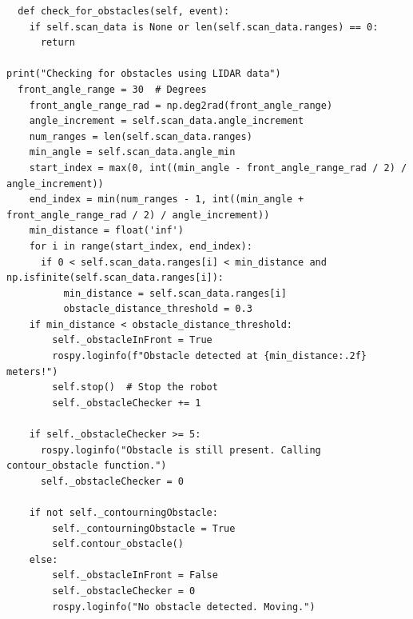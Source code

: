 \documentclass[a4paper,12pt]{extreport}
\begin{document}
  \begin{verbatim}
  def check_for_obstacles(self, event):
    if self.scan_data is None or len(self.scan_data.ranges) == 0:
      return  

print("Checking for obstacles using LIDAR data")
  front_angle_range = 30  # Degrees
    front_angle_range_rad = np.deg2rad(front_angle_range)
    angle_increment = self.scan_data.angle_increment
    num_ranges = len(self.scan_data.ranges)
    min_angle = self.scan_data.angle_min
    start_index = max(0, int((min_angle - front_angle_range_rad / 2) / angle_increment))
    end_index = min(num_ranges - 1, int((min_angle + front_angle_range_rad / 2) / angle_increment))
    min_distance = float('inf')
    for i in range(start_index, end_index):
      if 0 < self.scan_data.ranges[i] < min_distance and np.isfinite(self.scan_data.ranges[i]):
          min_distance = self.scan_data.ranges[i]
          obstacle_distance_threshold = 0.3  
    if min_distance < obstacle_distance_threshold:
        self._obstacleInFront = True
        rospy.loginfo(f"Obstacle detected at {min_distance:.2f} meters!")
        self.stop()  # Stop the robot
        self._obstacleChecker += 1

    if self._obstacleChecker >= 5:
      rospy.loginfo("Obstacle is still present. Calling contour_obstacle function.")
      self._obstacleChecker = 0

    if not self._contourningObstacle:
        self._contourningObstacle = True
        self.contour_obstacle()
    else:
        self._obstacleInFront = False
        self._obstacleChecker = 0  
        rospy.loginfo("No obstacle detected. Moving.")
\end{verbatim}
\end{document}
